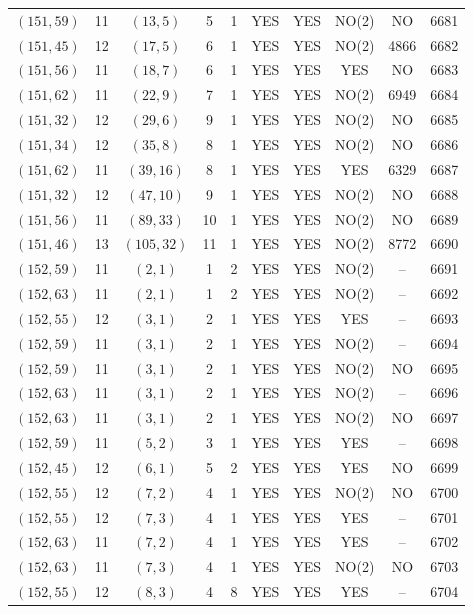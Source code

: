 \begin{longtable}{|c|c|c|c|c|c|c|c|c|c|}
$(151, 59)$ & 11 & $(13, 5)$ & 5 & 1 & YES & YES & NO(2) & NO & 6681\\
$(151, 45)$ & 12 & $(17, 5)$ & 6 & 1 & YES & YES & NO(2) & 4866 & 6682\\
$(151, 56)$ & 11 & $(18, 7)$ & 6 & 1 & YES & YES & YES & NO & 6683\\
$(151, 62)$ & 11 & $(22, 9)$ & 7 & 1 & YES & YES & NO(2) & 6949 & 6684\\
$(151, 32)$ & 12 & $(29, 6)$ & 9 & 1 & YES & YES & NO(2) & NO & 6685\\
$(151, 34)$ & 12 & $(35, 8)$ & 8 & 1 & YES & YES & NO(2) & NO & 6686\\
$(151, 62)$ & 11 & $(39, 16)$ & 8 & 1 & YES & YES & YES & 6329 & 6687\\
$(151, 32)$ & 12 & $(47, 10)$ & 9 & 1 & YES & YES & NO(2) & NO & 6688\\
$(151, 56)$ & 11 & $(89, 33)$ & 10 & 1 & YES & YES & NO(2) & NO & 6689\\
$(151, 46)$ & 13 & $(105, 32)$ & 11 & 1 & YES & YES & NO(2) & 8772 & 6690\\
$(152, 59)$ & 11 & $(2, 1)$ & 1 & 2 & YES & YES & NO(2) & -- & 6691\\
$(152, 63)$ & 11 & $(2, 1)$ & 1 & 2 & YES & YES & NO(2) & -- & 6692\\
$(152, 55)$ & 12 & $(3, 1)$ & 2 & 1 & YES & YES & YES & -- & 6693\\
$(152, 59)$ & 11 & $(3, 1)$ & 2 & 1 & YES & YES & NO(2) & -- & 6694\\
$(152, 59)$ & 11 & $(3, 1)$ & 2 & 1 & YES & YES & NO(2) & NO & 6695\\
$(152, 63)$ & 11 & $(3, 1)$ & 2 & 1 & YES & YES & NO(2) & -- & 6696\\
$(152, 63)$ & 11 & $(3, 1)$ & 2 & 1 & YES & YES & NO(2) & NO & 6697\\
$(152, 59)$ & 11 & $(5, 2)$ & 3 & 1 & YES & YES & YES & -- & 6698\\
$(152, 45)$ & 12 & $(6, 1)$ & 5 & 2 & YES & YES & YES & NO & 6699\\
$(152, 55)$ & 12 & $(7, 2)$ & 4 & 1 & YES & YES & NO(2) & NO & 6700\\
$(152, 55)$ & 12 & $(7, 3)$ & 4 & 1 & YES & YES & YES & -- & 6701\\
$(152, 63)$ & 11 & $(7, 2)$ & 4 & 1 & YES & YES & YES & -- & 6702\\
$(152, 63)$ & 11 & $(7, 3)$ & 4 & 1 & YES & YES & NO(2) & NO & 6703\\
$(152, 55)$ & 12 & $(8, 3)$ & 4 & 8 & YES & YES & YES & -- & 6704\\

\end{longtable}

